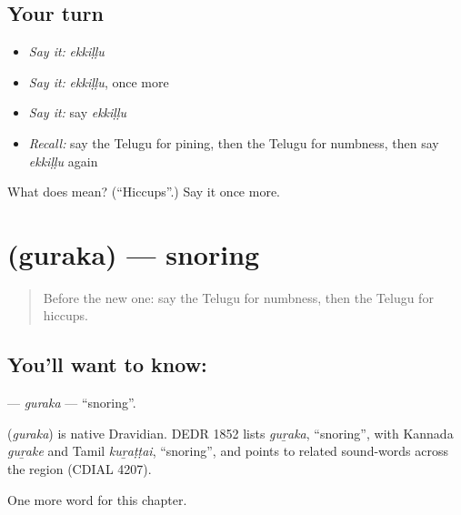 \subsection*{Your turn}
\begin{itemize}
\raggedright
  \item \emph{Say it:} \emph{ekkiḷḷu}
  \item \emph{Say it:} \emph{ekkiḷḷu}, once more
  \item \emph{Say it:} say \emph{ekkiḷḷu}
  \item \emph{Recall:} say the Telugu for pining, then the Telugu for numbness, then say \emph{ekkiḷḷu} again
\end{itemize}

\begin{tcolorbox}[breakable,colback=teal!4,colframe=teal!35!black,title={Before you move on}]
What does  mean? (\textquotedblleft{}Hiccups\textquotedblright{}.) Say it once more.
\end{tcolorbox}
\section[\texorpdfstring{\te{గురక} (guraka)}{గురక (guraka)}]{ (guraka) — snoring}

\label{lesson:TE-C211-guraka}



\begin{quote}
Before the new one: say the Telugu for numbness, then the Telugu for hiccups.
\end{quote}

\subsection*{You'll want to know: }
\textbf{} — \emph{guraka} — \textquotedblleft{}snoring\textquotedblright{}.

\begin{cousinweb}
\textbf{} (\emph{guraka}) is native Dravidian. DEDR 1852 lists \emph{guṟaka}, \textquotedblleft{}snoring\textquotedblright{}, with Kannada \emph{guṟake} and Tamil \emph{kuṟaṭṭai}, \textquotedblleft{}snoring\textquotedblright{}, and points to related sound-words across the region (CDIAL 4207).
\end{cousinweb}

\begin{grammarlens}[title={What you've built}]
One more word for this chapter.
\end{grammarlens}

